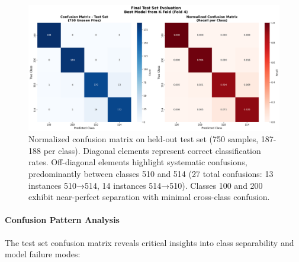 \documentclass[11pt,a4paper]{article}
\begin{document}
\begin{figure}[H]
  \centering
  \includegraphics[width=.85\linewidth]{images/test_set_confusion_matrix.png}
  \caption{Normalized confusion matrix on held-out test set (750 samples, 187-188 per class). Diagonal elements represent correct classification rates. Off-diagonal elements highlight systematic confusions, predominantly between classes 510 and 514 (27 total confusions: 13 instances 510→514, 14 instances 514→510). Classes 100 and 200 exhibit near-perfect separation with minimal cross-class confusion.}
  \label{fig:test_confusion}
\end{figure}

\paragraph{Confusion Pattern Analysis}
The test set confusion matrix reveals critical insights into class separability and model failure modes:
\end{document}
